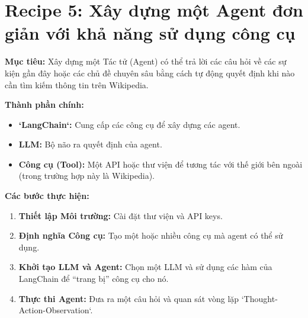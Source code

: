 
\section{Recipe 5: Xây dựng một Agent đơn giản với khả năng sử dụng công cụ}
\label{sec:recipe_agent}

\textbf{Mục tiêu:} Xây dựng một Tác tử (Agent) có thể trả lời các câu hỏi về các sự kiện gần đây hoặc các chủ đề chuyên sâu bằng cách tự động quyết định khi nào cần tìm kiếm thông tin trên Wikipedia.

\textbf{Thành phần chính:}
\begin{itemize}
    \item \textbf{`LangChain`:} Cung cấp các công cụ để xây dựng các agent.
    \item \textbf{LLM:} Bộ não ra quyết định của agent.
    \item \textbf{Công cụ (Tool):} Một API hoặc thư viện để tương tác với thế giới bên ngoài (trong trường hợp này là Wikipedia).
\end{itemize}

\textbf{Các bước thực hiện:}
\begin{enumerate}
    \item \textbf{Thiết lập Môi trường:} Cài đặt thư viện và API keys.
    \item \textbf{Định nghĩa Công cụ:} Tạo một hoặc nhiều công cụ mà agent có thể sử dụng.
    \item \textbf{Khởi tạo LLM và Agent:} Chọn một LLM và sử dụng các hàm của LangChain để “trang bị” công cụ cho nó.
    \item \textbf{Thực thi Agent:} Đưa ra một câu hỏi và quan sát vòng lặp `Thought-Action-Observation`.
\end{enumerate}

